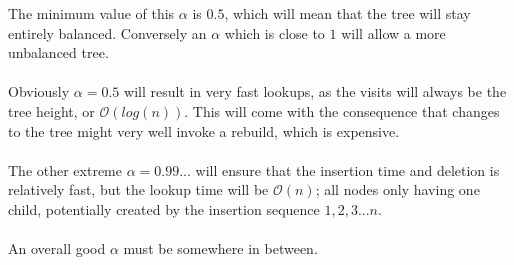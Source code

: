 \documentclass[oneside]{scrbook}
\begin{document}
The minimum value of this $\alpha$ is $0.5$, which will mean that the tree will stay entirely balanced.
Conversely an $\alpha$ which is close to $1$ will allow a more unbalanced tree.
\\\\
Obviously $\alpha = 0.5$ will result in very fast lookups, as the visits will always be the tree height, or $\mathcal{O}(log(n))$.
This will come with the consequence that changes to the tree might very well invoke a rebuild, which is expensive.
\\\\
The other extreme $\alpha = 0.99...$ will ensure that the insertion time and deletion is relatively fast, but the lookup time will be $\mathcal{O}(n)$;
all nodes only having one child, potentially created by the insertion sequence $1,2,3... n$.
\\\\
An overall good $\alpha$ must be somewhere in between.
\end{document}
